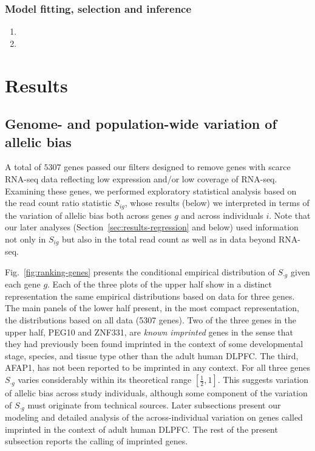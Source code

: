 \documentclass[letterpaper]{article}
\begin{document}
\subsubsection{Model fitting, selection and inference}

\begin{enumerate}
\item {}
\item {}
\end{enumerate}

\section{Results}

\subsection{Genome- and population-wide variation of allelic bias}

A total of \(5307\) genes passed our filters designed to remove genes with
scarce RNA-seq data reflecting low expression and/or low coverage of RNA-seq.
Examining these genes, we performed exploratory statistical analysis based on
the read count ratio statistic \(S_{ig}\), whose results (below) we
interpreted in terms of the variation of allelic bias both across genes \(g\)
and across individuals \(i\).  Note that our later analyses
(Section~\ref{sec:results-regression} and below) used
information not only in \(S_{ig}\) but also in the total read count as well as
in data beyond RNA-seq.

Fig.~\ref{fig:ranking-genes} presents the conditional empirical distribution
of \(S_{\cdot g}\) given each gene \(g\).  Each of the three plots of the
upper half show in a distinct representation the same empirical distributions
based on data for three genes.  The main panels of the lower half present, in
the most compact representation, the distributions based on all data (5307
genes).  Two of the three genes in the upper half, PEG10 and ZNF331, are
\emph{known imprinted} genes in the sense that they had previously been found
imprinted in the context of some developmental stage, species, and tissue type
other than the adult human DLPFC.  The third, AFAP1, has not been reported to be imprinted
in any context.  For all three genes \(S_{\cdot g}\) varies considerably
within its theoretical range \([\frac{1}{2}, 1]\).  This suggests variation of
allelic bias across study individuals, although some component of the
variation of \(S_{\cdot g}\) must originate from technical sources.  Later
subsections present our modeling and detailed analysis of the
across-individual variation on genes called imprinted in the context of adult
human DLPFC.  The rest of the present subsection reports the calling of
imprinted genes.
\end{document}
